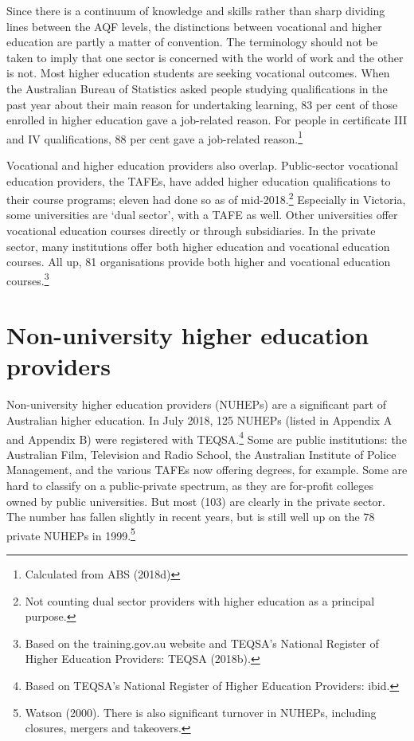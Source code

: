 \documentclass{grattan}
\begin{document}
Since there is a continuum of knowledge and skills rather than sharp dividing lines between the AQF levels, the distinctions between vocational and higher education are partly a matter of convention. The terminology should not be taken to imply that one sector is concerned with the world of work and the other is not. Most higher education students are seeking vocational outcomes. When the Australian Bureau of Statistics asked people studying qualifications in the past year about their main reason for undertaking learning, 83 per cent of those enrolled in higher education gave a job-related reason. For people in certificate III and IV qualifications, 88 per cent gave a job-related reason.\footnote{Calculated from ABS (2018d)}

Vocational and higher education providers also overlap. Public-sector vocational education providers, the TAFEs, have added higher education qualifications to their course programs; eleven had done so as of mid-2018.\footnote{Not counting dual sector providers with higher education as a principal purpose.} Especially in Victoria, some universities are `dual sector', with a TAFE as well. Other universities offer vocational education courses directly or through subsidiaries. In the private sector, many institutions offer both higher education and vocational education courses. All up, 81 organisations provide both higher and vocational education courses.\footnote{Based on the training.gov.au website and TEQSA's National Register of Higher Education Providers: TEQSA (2018b).}

%
\section{Non-university higher education providers}\label{sec:non-university-higher-education-providers}

Non-university higher education providers (NUHEPs) are a significant part of Australian higher education. In July 2018, 125 NUHEPs (listed in Appendix A and Appendix B) were registered with TEQSA.\footnote{Based on TEQSA's National Register of Higher Education Providers: ibid.} Some are public institutions: the Australian Film, Television and Radio School, the Australian Institute of Police Management, and the various TAFEs now offering degrees, for example. Some are hard to classify on a public-private spectrum, as they are for-profit colleges owned by public universities. But most (103) are clearly in the private sector. The number has fallen slightly in recent years, but is still well up on the 78 private NUHEPs in 1999.\footnote{Watson (2000). There is also significant turnover in NUHEPs, including closures, mergers and takeovers.}
\end{document}
